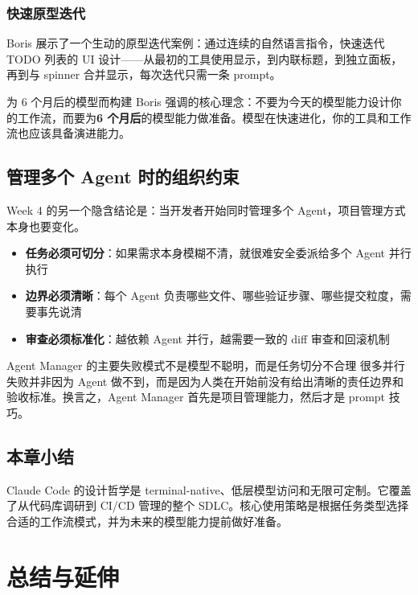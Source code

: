 \documentclass[a4paper]{article}
\begin{document}
\subsubsection{快速原型迭代}

Boris 展示了一个生动的原型迭代案例：通过连续的自然语言指令，快速迭代 TODO 列表的 UI 设计——从最初的工具使用显示，到内联标题，到独立面板，再到与 spinner 合并显示，每次迭代只需一条 prompt。

\begin{importantbox}{为 6 个月后的模型而构建}
Boris 强调的核心理念：不要为今天的模型能力设计你的工作流，而要为\textbf{6 个月后}的模型能力做准备。模型在快速进化，你的工具和工作流也应该具备演进能力。
\end{importantbox}

\subsection{管理多个 Agent 时的组织约束}

Week 4 的另一个隐含结论是：当开发者开始同时管理多个 Agent，项目管理方式本身也要变化。

\begin{itemize}
    \item \textbf{任务必须可切分}：如果需求本身模糊不清，就很难安全委派给多个 Agent 并行执行
    \item \textbf{边界必须清晰}：每个 Agent 负责哪些文件、哪些验证步骤、哪些提交粒度，需要事先说清
    \item \textbf{审查必须标准化}：越依赖 Agent 并行，越需要一致的 diff 审查和回滚机制
\end{itemize}

\begin{warningbox}{Agent Manager 的主要失败模式不是模型不聪明，而是任务切分不合理}
很多并行失败并非因为 Agent 做不到，而是因为人类在开始前没有给出清晰的责任边界和验收标准。换言之，Agent Manager 首先是项目管理能力，然后才是 prompt 技巧。
\end{warningbox}

\subsection{本章小结}

Claude Code 的设计哲学是 terminal-native、低层模型访问和无限可定制。它覆盖了从代码库调研到 CI/CD 管理的整个 SDLC。核心使用策略是根据任务类型选择合适的工作流模式，并为未来的模型能力提前做好准备。

\section{总结与延伸}
\end{document}
